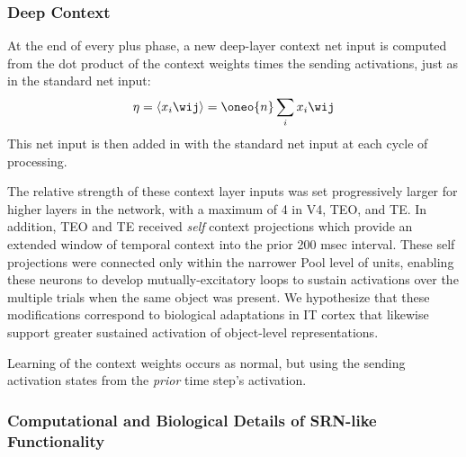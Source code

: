 \documentclass[12pt,twoside]{naturefigs}
\newif\myifpdf
\begin{document}
\subsubsection{Deep Context}

At the end of every plus phase, a new deep-layer context net input is computed from the dot product of the context weights times the sending activations, just as in the standard net input:
\begin{equation}
 \eta = \langle x_i \wij \rangle = \oneo{n} \sum_i x_i \wij
 \label{eq.net_in_ti}
\end{equation}
This net input is then added in with the standard net input at each cycle of processing.


The relative strength of these context layer inputs was set progressively larger for higher layers in the network, with a maximum of 4 in V4, TEO, and TE.  In addition, TEO and TE received {\em self} context projections which provide an extended window of temporal context into the prior 200 msec interval.  These self projections were connected only within the narrower Pool level of units, enabling these neurons to develop mutually-excitatory loops to sustain activations over the multiple trials when the same object was present.  We hypothesize that these modifications correspond to biological adaptations in IT cortex that likewise support greater sustained activation of object-level representations.

Learning of the context weights occurs as normal, but using the sending activation states from the {\em prior} time step's activation.

\subsubsection{Computational and Biological Details of SRN-like Functionality}
\end{document}
